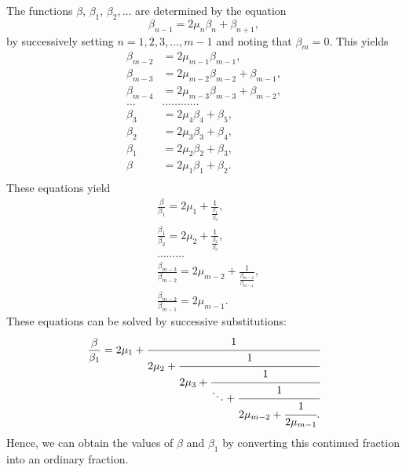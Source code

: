 \documentclass[oneside, 12 pt, leqno]{memoir}
\begin{document}
The functions \(\beta\), \(\beta_1\), \(\beta_2, \dots\) are determined by the equation
\[\beta_{n-1}=2 \mu_n \beta_n+\beta_{n+1},\]
by successively setting \(n=1,2,3, \dots, m-1\) and noting that \({\beta}_m=0\). This yields
\[\begin{aligned}
 \beta_{m-2}&=2 \mu_{m-1} \beta_{m-1}, \\
 \beta_{m-3}&=2 \mu_{m-2} \beta_{m-2}+\beta_{m-1}, \\
 \beta_{m-4}&=2 \mu_{m-3} \beta_{m-3}+\beta_{m-2}, \\
 \dots &\dots \dots \dots \dots \\
 \beta_3&=2 \mu_4 \beta_4+\beta_5, \\
 \beta_2&=2 \mu_3 \beta_3+\beta_4,  \\
 \beta_1&=2 \mu_2 \beta_2+\beta_3, \\
 \beta &=2 \mu_1 \beta_1+\beta_2. \\
\end{aligned}\]
These equations yield
\[\begin{aligned}
& \frac{\beta}{\beta_1}=2 \mu_1+\frac{1}{\frac{\beta_1}{\beta_2}}, \\
& \frac{\beta_1}{\beta_2}=2 \mu_2 +\frac{1}{\frac{\beta_2}{\beta_3}}, \\
& \dots \dots \dots \\
& \frac{\beta_{m-3}}{\beta_{m-2}}=2 \mu_{m-2}+\frac{1}{\frac{\beta_{m-2}}{\beta_{m-1}}}, \\
& \frac{\beta_{m-2}}{\beta_{m-1}}=2 \mu_{m-1}.
\end{aligned}\]
These equations can be solved by successive substitutions:
\[\frac{\beta}{\beta_1}=2 \mu_1+\cfrac{1}{2 \mu_2+\cfrac{1}{2 \mu_3+\cfrac{1}{\ddots+\cfrac{1}{2 \mu_{m-2}+\cfrac{1}{2 \mu_{m-1}}.}}}}\]
Hence, we can obtain the values of \(\beta\) and \(\beta_1\) by converting this continued fraction into an ordinary fraction.
%
\end{document}

